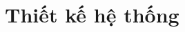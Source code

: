 \documentclass[t, aspectratio=169]{beamer}
\begin{document}

\section{Thiết kế hệ thống}
\end{document}
